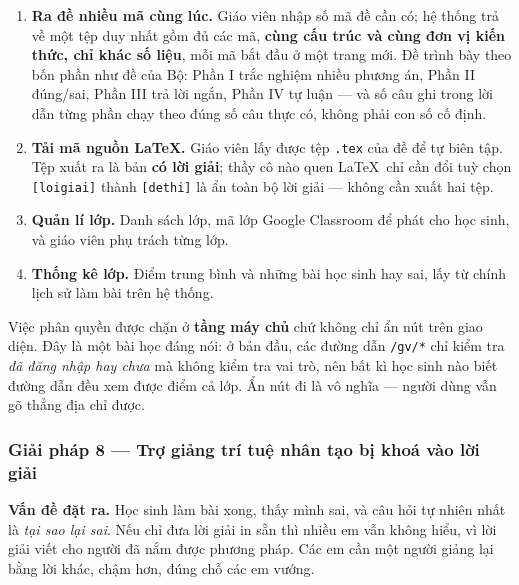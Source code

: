\begin{enumerate}[label=(\arabic*), leftmargin=1.2cm, itemsep=3pt]
  \item \textbf{Ra đề nhiều mã cùng lúc.} Giáo viên nhập số mã đề cần có; hệ
        thống trả về một tệp duy nhất gồm đủ các mã, \textbf{cùng cấu trúc và
        cùng đơn vị kiến thức, chỉ khác số liệu}, mỗi mã bắt đầu ở một trang
        mới. Đề trình bày theo bốn phần như đề của Bộ: Phần I trắc nghiệm
        nhiều phương án, Phần II đúng/sai, Phần III trả lời ngắn, Phần IV tự
        luận --- và số câu ghi trong lời dẫn từng phần chạy theo đúng số câu
        thực có, không phải con số cố định.
  \item \textbf{Tải mã nguồn \LaTeX.} Giáo viên lấy được tệp \texttt{.tex} của
        đề để tự biên tập. Tệp xuất ra là bản \textbf{có lời giải}; thầy cô nào
        quen \LaTeX\ chỉ cần đổi tuỳ chọn \texttt{[loigiai]} thành
        \texttt{[dethi]} là ẩn toàn bộ lời giải --- không cần xuất hai tệp.
  \item \textbf{Quản lí lớp.} Danh sách lớp, mã lớp Google Classroom để phát
        cho học sinh, và giáo viên phụ trách từng lớp.
  \item \textbf{Thống kê lớp.} Điểm trung bình và những bài học sinh hay sai,
        lấy từ chính lịch sử làm bài trên hệ thống.
\end{enumerate}

Việc phân quyền được chặn ở \textbf{tầng máy chủ} chứ không chỉ ẩn nút trên
giao diện. Đây là một bài học đáng nói: ở bản đầu, các đường dẫn \texttt{/gv/*}
chỉ kiểm tra \textit{đã đăng nhập hay chưa} mà không kiểm tra vai trò, nên bất
kì học sinh nào biết đường dẫn đều xem được điểm cả lớp. Ẩn nút đi là vô nghĩa
--- người dùng vẫn gõ thẳng địa chỉ được.



\subsubsection{Giải pháp 8 --- Trợ giảng trí tuệ nhân tạo bị khoá vào lời giải}

\textbf{Vấn đề đặt ra.} Học sinh làm bài xong, thấy mình sai, và câu hỏi tự
nhiên nhất là \textit{tại sao lại sai}. Nếu chỉ đưa lời giải in sẵn thì nhiều
em vẫn không hiểu, vì lời giải viết cho người đã nắm được phương pháp. Các em
cần một người giảng lại bằng lời khác, chậm hơn, đúng chỗ các em vướng.

